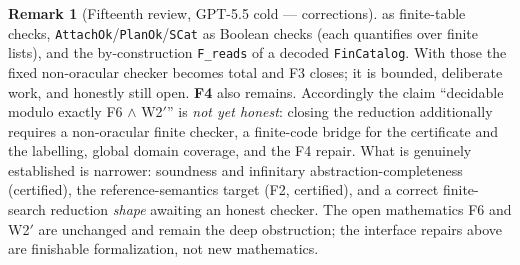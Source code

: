 \documentclass[11pt]{article}
\newcommand{\code}[1]{\texttt{#1}}
\theoremstyle{plain}
\theoremstyle{definition}
\newtheorem{remark}[theorem]{Remark}
\begin{document}
\begin{remark}[Fifteenth review, GPT-5.5 cold --- corrections]
as finite-table checks, \code{AttachOk}/\code{PlanOk}/\code{SCat} as
Boolean checks (each quantifies over finite lists), and the
by-construction \code{F\_reads} of a decoded \code{FinCatalog}. With
those the fixed non-oracular checker becomes total and F3 closes; it is
bounded, deliberate work, and honestly still open. \textbf{F4} also
remains. Accordingly the
claim ``decidable modulo exactly F6 $\wedge$ W2$'$'' is \emph{not yet
honest}: closing the reduction additionally requires a non-oracular
finite checker, a finite-code bridge for the certificate and the
labelling, global domain coverage, and the F4 repair. What is genuinely
established is narrower: soundness and infinitary abstraction-completeness
(certified), the reference-semantics target (F2, certified), and a
correct finite-search reduction \emph{shape} awaiting an honest checker.
The open mathematics F6 and W2$'$ are unchanged and remain the deep
obstruction; the interface repairs above are finishable formalization,
not new mathematics.
\end{remark}
\end{document}
